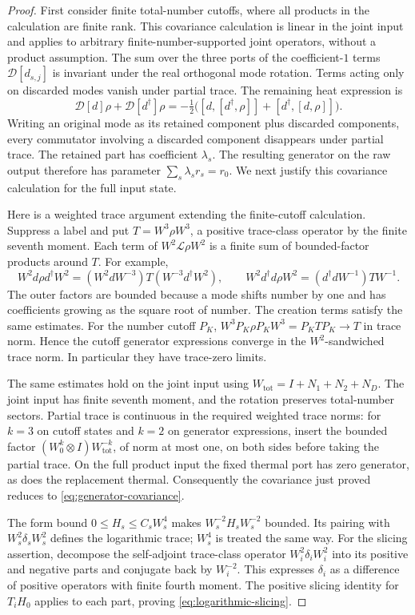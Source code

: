 \begin{proof}
First consider finite total-number cutoffs, where all products in the
calculation are finite rank.  This covariance calculation is linear in
the joint input and applies to arbitrary finite-number-supported joint
operators, without a product assumption.  The sum over the three ports of the
coefficient-$1$ terms $\mathcal D[d_{s,j}]$ is invariant under the real
orthogonal mode rotation.  Terms acting only on discarded modes vanish
under partial trace.  The remaining heat expression is
\[
 \mathcal D[d]\rho+\mathcal D[d^\dagger]\rho
 =-\tfrac12\bigl([d,[d^\dagger,\rho]]
                   +[d^\dagger,[d,\rho]]\bigr).
\]
Writing an original mode as its retained component plus discarded
components, every commutator involving a discarded component disappears
under partial trace.  The retained part has coefficient $\lambda_s$.
The resulting generator on the raw output therefore has parameter
$\sum_s\lambda_sr_s=r_0$.
We next justify this covariance calculation for the full input state.

Here is a weighted trace argument extending the finite-cutoff calculation.
Suppress a label and put $T=W^3\rho W^3$, a positive trace-class operator
by the finite seventh moment.  Each term of $W^2\mathcal L\rho W^2$ is a
finite sum of bounded-factor products around $T$.  For example,
\[
 W^2d\rho d^\dagger W^2
  =(W^2dW^{-3})T(W^{-3}d^\dagger W^2),
 \qquad
 W^2d^\dagger d\rho W^2=(d^\dagger dW^{-1})TW^{-1}.
\]
The outer factors are bounded because a mode shifts number by one and
has coefficients growing as the square root of number.  The creation
terms satisfy the same estimates.  For the number cutoff $P_K$,
$W^3P_K\rho P_KW^3=P_KTP_K\to T$ in trace norm.  Hence the cutoff
generator expressions converge in the $W^2$-sandwiched trace norm.
In particular they have trace-zero limits.

The same estimates hold on the joint input using
$W_{\mathrm{tot}}=I+N_1+N_2+N_D$.  The joint input has finite seventh
moment, and the rotation preserves total-number sectors. Partial trace
is continuous in the required weighted trace norms: for $k=3$ on cutoff
states and $k=2$ on generator expressions, insert the bounded factor
$(W_0^k\otimes I)W_{\mathrm{tot}}^{-k}$, of norm at most one, on both sides
before taking the partial trace. On the full product input the fixed
thermal port has zero generator, as does the replacement thermal.
Consequently the covariance just proved reduces to
\eqref{eq:generator-covariance}.

The form bound $0\le H_s\le C_sW_s^4$ makes
$W_s^{-2}H_sW_s^{-2}$ bounded.  Its pairing with
$W_s^2\delta_sW_s^2$ defines the logarithmic trace; $W_s^4$ is treated
the same way.  For the slicing assertion, decompose the self-adjoint
trace-class operator $W_i^2\delta_iW_i^2$ into its positive and negative
parts and conjugate back by $W_i^{-2}$.  This expresses $\delta_i$ as a
difference of positive operators with finite fourth moment.  The positive
slicing identity for $T_iH_0$ applies to each part, proving
\eqref{eq:logarithmic-slicing}.
\end{proof}

